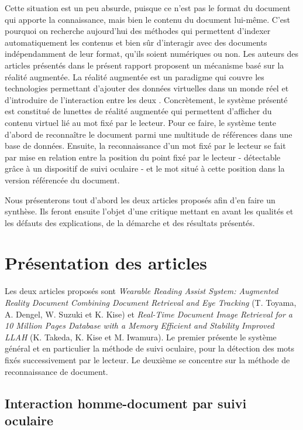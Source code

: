 \documentclass[a4paper]{article}
\begin{document}
Cette situation est un peu absurde, puisque ce n'est pas le format du document qui apporte la connaissance, mais bien le contenu du document lui-même. C'est pourquoi on recherche aujourd'hui des méthodes qui permettent d'indexer automatiquement les contenus et bien sûr d'interagir avec des documents indépendamment de leur format, qu'ils soient numériques ou non. Les auteurs des articles présentés dans le présent rapport proposent un mécanisme basé sur la réalité augmentée. La réalité augmentée est un paradigme qui couvre les technologies permettant d'ajouter des données virtuelles dans un monde réel et d'introduire de l'interaction entre les deux \cite{augmented-reality}. Concrètement, le système présenté est constitué de lunettes de réalité augmentée qui permettent d'afficher du contenu virtuel lié au mot fixé par le lecteur. Pour ce faire, le système tente d'abord de reconnaître le document parmi une multitude de références dans une base de données. Ensuite, la reconnaissance d'un mot fixé par le lecteur se fait par mise en relation entre la position du point fixé par le lecteur - détectable grâce à un dispositif de suivi oculaire - et le mot situé à cette position dans la version référencée du document.

Nous présenterons tout d'abord les deux articles proposés afin d'en faire un synthèse. Ils feront ensuite l'objet d'une critique mettant en avant les qualités et les défauts des explications, de la démarche et des résultats présentés.

\section{Présentation des articles}

Les deux articles proposés sont \textit{Wearable Reading Assist System: Augmented Reality Document Combining Document Retrieval and Eye Tracking} (T. Toyama, A. Dengel, W. Suzuki et K. Kise) et \textit{Real-Time Document Image Retrieval for a 10 Million Pages Database with a Memory Efficient and Stability Improved LLAH} (K. Takeda, K. Kise et M. Iwamura). Le premier présente le système général et en particulier la méthode de suivi oculaire, pour la détection des mots fixés successivement par le lecteur. Le deuxième se concentre sur la méthode de reconnaissance de document.

\subsection{Interaction homme-document par suivi oculaire}
\end{document}
